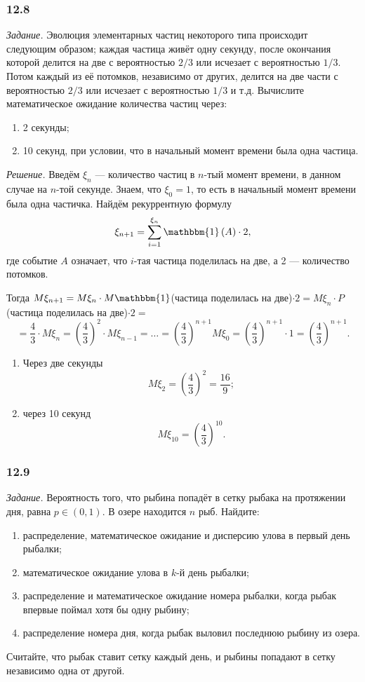 \subsubsection*{12.8}

\textit{Задание.}
Эволюция элементарных частиц некоторого типа происходит следующим образом;
каждая частица живёт одну секунду, после окончания которой делится на две с вероятностью $2/3$ или исчезает с вероятностью $1/3$.
Потом каждый из её потомков, независимо от других, делится на две части с вероятностью $2/3$ или исчезает с вероятностью $1/3$ и т.д.
Вычислите математическое ожидание количества частиц через:
\begin{enumerate}[label=\alph*)]
\item 2 секунды;
\item 10 секунд, при условии, что в начальный момент времени была одна частица.
\end{enumerate}

\textit{Решение.} Введём $ \xi_n$ --- количество частиц в $n$-тый момент времени, в данном случае на $n$-той секунде.
Знаем, что $ \xi_0 = 1$, то есть в начальный момент времени была одна частичка.
Найдём рекуррентную формулу
$$ \xi_{n+1} = \sum \limits_{i=1}^{ \xi_n} \mathbbm{1} \left( A \right) \cdot 2,$$
где событие $A$ означает, что $i$-тая частица поделилась на две, а 2 --- количество потомков.

Тогда $M \xi_{n+1} = M \xi_n \cdot M \mathbbm{1}$(частица поделилась на две)$ \cdot 2 = M \xi_n \cdot P$(частица поделилась на две)$ \cdot 2 =$
$$= \frac{4}{3} \cdot M \xi_n =
\left( \frac{4}{3} \right)^2 \cdot M \xi_{n-1} =
\dotsc =
\left( \frac{4}{3} \right)^{n+1} M \xi_0 =
\left( \frac{4}{3} \right)^{n+1} \cdot 1 =
\left( \frac{4}{3} \right)^{n+1}.$$

\begin{enumerate}[label=\alph*)]
\item Через две секунды
$$M \xi_2 =
\left( \frac{4}{3} \right)^2 =
\frac{16}{9};$$
\item через 10 секунд
$$M \xi_{10} =
\left( \frac{4}{3} \right)^{10}.$$
\end{enumerate}

\subsubsection*{12.9}

\textit{Задание.} Вероятность того, что рыбина попадёт в сетку рыбака на протяжении дня, равна $p \in \left( 0, 1 \right) $.
В озере находится $n$ рыб.
Найдите:
\begin{enumerate}[label=\alph*)]
\item распределение, математическое ожидание и дисперсию улова в первый день рыбалки;
\item математическое ожидание улова в $k$-й день рыбалки;
\item распределение и математическое ожидание номера рыбалки, когда рыбак впервые поймал хотя бы одну рыбину;
\item распределение номера дня, когда рыбак выловил последнюю рыбину из озера.
\end{enumerate}
Считайте, что рыбак ставит сетку каждый день, и рыбины попадают в сетку независимо одна от другой.

